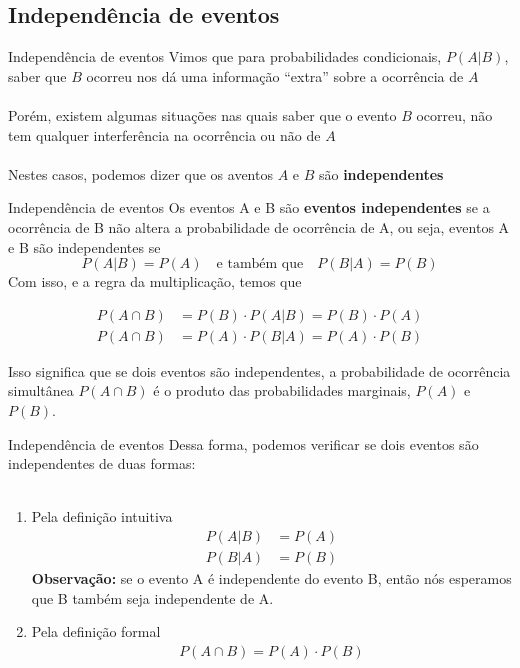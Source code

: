 \documentclass[10pt]{beamer}\usepackage[]{graphicx}\usepackage[]{color}
\theoremstyle{definition}
\begin{document}
\subsection{Independência de eventos}

\begin{frame}{Independência de eventos}
  Vimos que para probabilidades condicionais, $P(A|B)$, saber que $B$
  ocorreu nos dá uma informação ``extra'' sobre a ocorrência de $A$ \\~\\
  Porém, existem algumas situações nas quais saber que o evento $B$
  ocorreu, não tem qualquer interferência na ocorrência ou não de $A$\\~\\
  Nestes casos, podemos dizer que os aventos $A$ e $B$ são
  \textbf{independentes}
\end{frame}

\begin{frame}{Independência de eventos}
  Os eventos A e B são \textbf{eventos independentes} se a ocorrência de
  B não altera a probabilidade de ocorrência de A, ou seja, eventos A e
  B são independentes se
  \begin{equation*}
    P(A|B) = P(A) \quad \text{e também que} \quad P(B|A) = P(B)
  \end{equation*}
  Com isso, e a regra da multiplicação, temos que
  \begin{block}{}
    \begin{align*}
      P(A \cap B) &= P(B) \cdot P(A|B) = P(B) \cdot P(A) \\
      P(A \cap B) &= P(A) \cdot P(B|A) = P(A) \cdot P(B)
    \end{align*}
  \end{block}
  Isso significa que se dois eventos são independentes, a probabilidade
  de ocorrência simultânea $P(A \cap B)$ é o produto das probabilidades
  marginais, $P(A)$ e $P(B)$.
\end{frame}

\begin{frame}{Independência de eventos}
  Dessa forma, podemos verificar se dois eventos são independentes de
  duas formas: \\~\\
  \begin{enumerate}
  \item Pela definição intuitiva
    \begin{align*}
      P(A|B) &= P(A) \\
      P(B|A) &= P(B)
    \end{align*}
    \textbf{Observação:} se o evento A é independente do evento B, então
    nós esperamos que B também seja independente de A.
  \item Pela definição formal
    \begin{align*}
      P(A \cap B) = P(A) \cdot P(B)
    \end{align*}
  \end{enumerate}
\end{frame}
\end{document}

